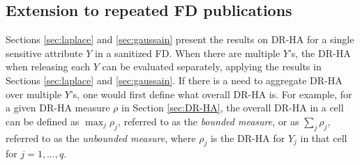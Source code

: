 \documentclass[10pt,journal,compsoc]{IEEEtran}
\begin{document}
\vspace{-9pt}\subsection{Extension to repeated FD publications} \label{sec:repeated} \vspace{-3pt}
Sections \ref{sec:laplace} and \ref{sec:gaussain} present the results on DR-HA for a single sensitive attribute $Y$ in a sanitized FD. When there are multiple $Y$'s, the DR-HA when releasing each $Y$ can be evaluated separately, applying the results in Sections \ref{sec:laplace} and \ref{sec:gaussain}. If there is a need to aggregate DR-HA over multiple $Y$'s, one would first define what overall DR-HA is. For example, for a given DR-HA measure $\rho$ in Section \ref{sec:DR-HA}, the overall DR-HA in a cell can be defined as $\max_j\rho_j$, referred to as the \emph{bounded measure}, or  as $\sum_j\rho_j$, referred to as the  \emph{unbounded measure}, where $\rho_j$ is the DR-HA for $Y_j$ in that cell for $j=1,\ldots,q$.
\end{document}
